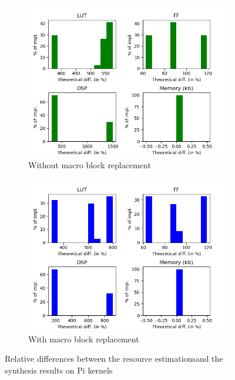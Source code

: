 \begin{figure}[h!]
    \centering
    \begin{subfigure}{1.0\textwidth}
        \centering
        \includegraphics[width=.8\textwidth]{Figures/results/piRelativeWithoutMacro}
        \caption{Without macro block replacement}
        \label{ch.expe:sec.estimators:ssec.resource:fig.pi:sfig.without}
    \end{subfigure}
    \begin{subfigure}{1.0\textwidth}
        \centering
        \includegraphics[width=.8\textwidth]{Figures/results/piRelativeWithMacro}
        \caption{With macro block replacement}
        \label{ch.expe:sec.estimators:ssec.resource:fig.pi:sfig.with}
    \end{subfigure}
    \caption[Quality of resource estimation on Pi]{Relative differences between the resource estimations\newline and the synthesis results on Pi kernels}
    \label{ch.expe:sec.estimators:ssec.resource:fig.pi}
\end{figure}
\clearpage

